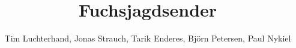 \documentclass[DIN, pagenumber=false, fontsize=11pt, parskip=half]{scrartcl}
\title{Fuchsjagdsender}
\author{Tim Luchterhand, Jonas Strauch, Tarik Enderes, Björn Petersen, Paul Nykiel}
\begin{document}
\maketitle
\tableofcontents
\pagebreak






%


\end{document}
